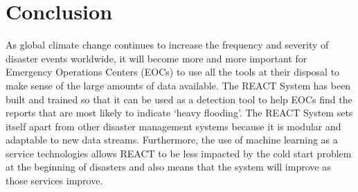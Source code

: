 \section{Conclusion}
As global climate change continues to increase the frequency and severity of
disaster events worldwide, it will become more and more important for Emergency
Operations Centers (EOCs) to use all the tools at their disposal to make sense
of the large amounts of data available.
The REACT System has been built and trained so that it can be used as
a detection tool to help EOCs find the reports that are most likely to indicate
`heavy flooding'. The REACT System sets itself apart from other disaster
management systems because it is modular and adaptable to new data streams.
Furthermore, the use of machine learning as a service technologies allows REACT
to be less impacted by the cold start problem at the beginning of disasters and
also means that the system will improve as those services improve. 
